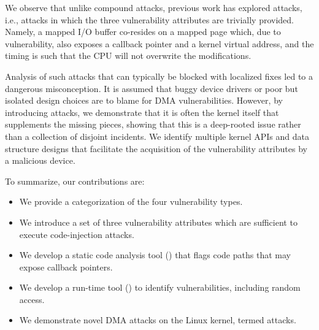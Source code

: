 We observe that unlike compound attacks, previous work has explored \simple{} attacks, i.e., attacks in which the three vulnerability attributes are trivially provided. 
Namely, a mapped I/O buffer co-resides on a mapped page which, due to \subpage{} vulnerability, also exposes a callback pointer and a kernel virtual address, and the timing is such that the CPU will not overwrite the modifications.

Analysis of such \simple{} attacks that can typically be blocked with localized fixes led to a dangerous misconception. It is assumed that buggy device drivers or poor but isolated design choices are to blame for DMA vulnerabilities.
However, by introducing \compound attacks, we demonstrate that it is often the kernel itself that supplements the missing pieces, showing that this is a deep-rooted issue rather than a collection of disjoint incidents.
We identify multiple kernel APIs and data structure designs that facilitate the acquisition of the vulnerability attributes by a malicious device.


To summarize, our contributions are:
\begin{itemize}
    \item We provide a categorization of the four \subpage{} vulnerability types.
    \item We introduce a set of three vulnerability attributes which are sufficient to execute code-injection attacks.
    \item We develop a static code analysis tool (\tool) that flags code paths that may expose callback pointers.
    \item We develop a run-time tool (\dkasan) to identify \subpage{} vulnerabilities, including random access.
    \item We demonstrate novel DMA attacks on the Linux kernel, termed \compound{} attacks.
\end{itemize}

